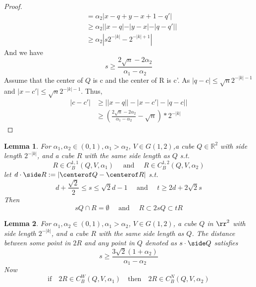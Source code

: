\documentclass{article}
\newtheorem{lemma}{Lemma}
\begin{document}
\begin{proof}
\begin{equation*}
\begin{aligned}
    & = \alpha_2|x-q+y-x+1-q'| \\
    & \geq \alpha_2||x - q| - |y - x| - |q - q'|| \\
    & \geq \alpha_2|s2^{-|k|} - 2^{-|k| + 1}|
\end{aligned}
\end{equation*}
And we have
\[s \geq \frac{2\sqrt{n} - 2\alpha_2}{\alpha_1 - \alpha_2}\]
Assume that the center of $Q$ is c and the center of R is c'. As $|q - c| \leq \sqrt{n}2^{-|k|-1}$ and $|x - c'|\leq \sqrt{n}2^{-|k|-1}$. Thus, 
\begin{equation*}
    \begin{aligned}
        |c - c'| & \geq ||x - q|| - |x - c'| - |q - c|| \\
        & \geq (\frac{2\sqrt{n} - 2\alpha_2}{\alpha_1 - \alpha_2} - \sqrt{n})*2^{-|k|}
    \end{aligned}
\end{equation*}
\end{proof}
\begin{lemma}
     For $\alpha_1, \alpha_2\in(0,1), \alpha_1>\alpha_2$, $V\in G(1,2)$,a cube $Q\in \mathbb{R}^2$ with side length $2^{-|k|}$, and a cube $R$ with the same side length as $Q$ s.t.
    \begin{equation}\label{eq:condition-GDBC-2}
        R\in C_B^{1,1}(Q, V, \alpha_1) \quad\text{ and }\quad R\in  C_B^{1,2}(Q, V, \alpha_2)
    \end{equation}
    let  $d\cdot \side R:=|\centerof Q-\centerof R|$ s.t.
    \begin{equation}\label{eq:tRcover2sQ-cond}
        d+\frac{\sqrt{2}}{2}\leq s \leq \sqrt{2}d-1 \quad\text{ and }\quad t \geq 2d + 2\sqrt{2}s
    \end{equation} 
    Then    
    \begin{equation}\label{eq:tRcover2sQ-conclusion}
        sQ\cap R = \emptyset \quad\text{ and }\quad R\subset 2sQ\subset tR
    \end{equation}
\end{lemma}
\begin{lemma}\label{lemma:Guarantee-Distance-contain2R-Between-2alpha}
    For $\alpha_1, \alpha_2\in(0,1), \alpha_1>\alpha_2$, $V\in G(1,2)$, a cube $Q$ in $\rr^2$ with side length $2^{-|k|}$, and a cube $R$ with the same side length as $Q$. The distance between some point in $2R$ and any point in $Q$ denoted as $s\cdot \side Q$ satisfies
    \begin{equation}\label{eq:lb4s}
        s\geq \frac{3\sqrt{2}(1+\alpha_2)}{\alpha_1-\alpha_2}
    \end{equation}
    Now
    \begin{equation}\label{eq:condition-2RinC}
        \text{if}\quad 2R\in C_B^W(Q, V, \alpha_1) \quad\text{then}\quad 2R\in  C_B^N(Q, V, \alpha_2)
    \end{equation}
\end{lemma}
\end{document}
